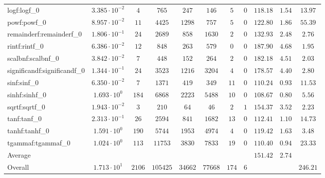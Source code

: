 \begin{tabular}{|l|c|c|c|c|c|c|c|c|c|c|}
logf:logf\_0                 & $ 3.385 \cdot 10^{-2} $ & $ 4      $ & $ 765    $ & $ 247   $ & $ 146   $ & $ 5   $ & $ 0 $ & $ 118.18      $ & $ 1.54    $ & $ 13.97   $ \\
powf:powf\_0                 & $ 8.957 \cdot 10^{-2} $ & $ 11     $ & $ 4425   $ & $ 1298  $ & $ 757   $ & $ 5   $ & $ 0 $ & $ 122.80      $ & $ 1.86    $ & $ 55.39   $ \\
remainderf:remainderf\_0     & $ 1.806 \cdot 10^{-1} $ & $ 24     $ & $ 2689   $ & $ 858   $ & $ 1630  $ & $ 2   $ & $ 0 $ & $ 132.93      $ & $ 2.48    $ & $ 2.76    $ \\
rintf:rintf\_0               & $ 6.386 \cdot 10^{-2} $ & $ 12     $ & $ 848    $ & $ 263   $ & $ 579   $ & $ 0   $ & $ 0 $ & $ 187.90      $ & $ 4.68    $ & $ 1.95    $ \\
scalbnf:scalbnf\_0           & $ 3.842 \cdot 10^{-2} $ & $ 7      $ & $ 448    $ & $ 152   $ & $ 264   $ & $ 2   $ & $ 0 $ & $ 182.18      $ & $ 4.51    $ & $ 2.03    $ \\
significandf:significandf\_0 & $ 1.344 \cdot 10^{-1} $ & $ 24     $ & $ 3523   $ & $ 1216  $ & $ 3204  $ & $ 4   $ & $ 0 $ & $ 178.57      $ & $ 4.40    $ & $ 2.80    $ \\
sinf:sinf\_0                 & $ 6.350 \cdot 10^{-2} $ & $ 7      $ & $ 1371   $ & $ 419   $ & $ 349   $ & $ 11  $ & $ 0 $ & $ 110.24      $ & $ 0.93    $ & $ 11.53   $ \\
sinhf:sinhf\_0               & $ 1.693 \cdot 10^{0}  $ & $ 184    $ & $ 6868   $ & $ 2223  $ & $ 5488  $ & $ 10  $ & $ 0 $ & $ 108.67      $ & $ 0.80    $ & $ 5.56    $ \\
sqrtf:sqrtf\_0               & $ 1.943 \cdot 10^{-2} $ & $ 3      $ & $ 210    $ & $ 64    $ & $ 46    $ & $ 2   $ & $ 1 $ & $ 154.37      $ & $ 3.52    $ & $ 2.23    $ \\
tanf:tanf\_0                 & $ 2.313 \cdot 10^{-1} $ & $ 26     $ & $ 2594   $ & $ 841   $ & $ 1682  $ & $ 13  $ & $ 0 $ & $ 112.41      $ & $ 1.10    $ & $ 14.73   $ \\
tanhf:tanhf\_0               & $ 1.591 \cdot 10^{0}  $ & $ 190    $ & $ 5744   $ & $ 1953  $ & $ 4974  $ & $ 4   $ & $ 0 $ & $ 119.42      $ & $ 1.63    $ & $ 3.48    $ \\
tgammaf:tgammaf\_0           & $ 1.024 \cdot 10^{0}  $ & $ 113    $ & $ 11753  $ & $ 3830  $ & $ 7833  $ & $ 19  $ & $ 0 $ & $ 110.40      $ & $ 0.94    $ & $ 23.33   $ \\
\hline
Average                      & $                     $ & $        $ & $        $ & $       $ & $       $ & $     $ & $   $ & $ 151.42      $ & $ 2.74    $ & $         $ \\
\hline
Overall                      & $ 1.713 \cdot 10^{1}  $ & $ 2106   $ & $ 105425 $ & $ 34662 $ & $ 77668 $ & $ 174 $ & $ 6 $ & $             $ & $         $ & $ 246.21  $ \\
\hline
\end{tabular}
